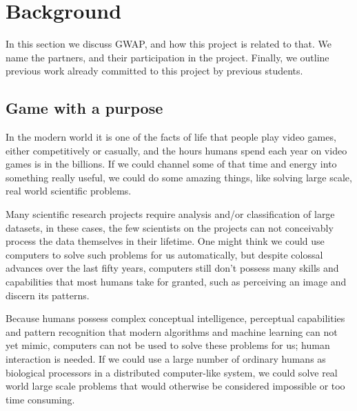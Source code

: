 \section{Background}\label{sec:background}
In this section we discuss GWAP\cite{GWAP}, and how this project is related to that. We name the partners, and their participation in the project. Finally, we outline previous work already committed to this project by previous students.

\subsection{Game with a purpose}
In the modern world it is one of the facts of life that people play video games, either competitively or casually, and the hours humans 
spend each year on video games is in the billions. If we could channel some of that time and energy into 
something really useful, we could do some amazing things, like solving large scale, real world scientific problems.

Many scientific research projects require analysis and/or 
classification of large datasets, in these cases, the few scientists on the projects can not conceivably process the data themselves in 
their lifetime. One might think we could use computers to solve such problems for us automatically, but despite colossal advances over the last fifty years, computers still don't possess many skills and capabilities that most humans take for granted, such as perceiving an image and discern its patterns.

Because humans possess complex conceptual intelligence, perceptual capabilities and pattern recognition that modern algorithms and machine learning can not yet mimic, computers can not be used to solve these problems for us; human interaction is needed. If we could use a large number of ordinary humans as biological processors in a distributed computer-like system, we could solve real world large scale problems that would otherwise be considered impossible or too time consuming.

